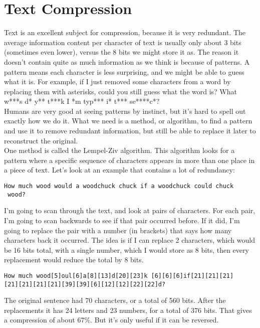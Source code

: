 \section{Text Compression}

Text is an excellent subject for compression, because it is very redundant. The average information content per character of text is usually only about 3 bits (sometimes even lower), versus the 8 bits we might store it as. The reason it doesn't contain quite as much information as we think is because of patterns. A pattern means each character is less surprising, and we might be able to guess what it is. For example, if I just removed some characters from a word by replacing them with asterisks, could you still guess what the word is? What w***s d* y** t***k I *m typ*** i* t*** se****c*?\\

Humans are very good at seeing patterns by instinct, but it's hard to spell out exactly how we do it. What we need is a method, or algorithm, to find a pattern and use it to remove redundant information, but still be able to replace it later to reconstruct the original.\\

One method is called the Lempel-Ziv algorithm. This algorithm looks for a pattern where a specific sequence of characters appears in more than one place in a piece of text. Let's look at an example that contains a lot of redundancy:\\

\begin{verbatim}
How much wood would a woodchuck chuck if a woodchuck could chuck
 wood?
\end{verbatim}

I'm going to scan through the text, and look at pairs of characters. For each pair, I'm going to scan backwards to see if that pair occurred before. If it did, I'm going to replace the pair with a number (in brackets) that says how many characters back it occurred. The idea is if I can replace 2 characters, which would be 16 bits total, with a single number, which I would store as 8 bits, then every replacement would reduce the total by 8 bits.\\

\begin{verbatim}
How much wood[5]oul[6]a[8][13]d[20][23]k [6][6][6]if[21][21][21]
[21][21][21][21][39][39][6][12][12][22][22]d?
\end{verbatim}

The original sentence had 70 characters, or a total of 560 bits. After the replacements it has 24 letters and 23 numbers, for a total of 376 bits. That gives a compression of about 67\%. But it's only useful if it can be reversed.\\

